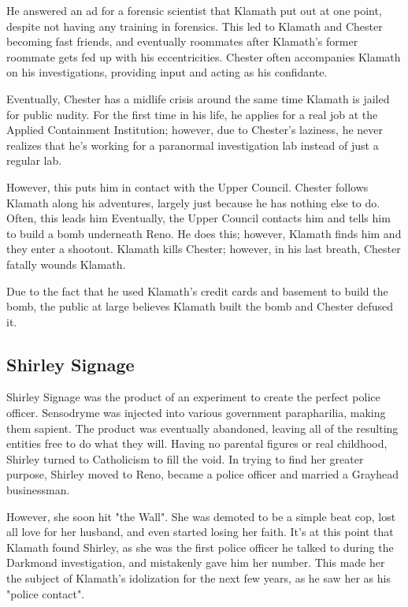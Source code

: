 \documentclass{article}
\begin{document}
He answered an ad for a forensic scientist that Klamath put out at one point, despite not having any training in forensics. This led to Klamath and Chester becoming fast friends, and eventually roommates after Klamath's former roommate gets fed up with his eccentricities. Chester often accompanies Klamath on his investigations, providing input and acting as his confidante.

Eventually, Chester has a midlife crisis around the same time Klamath is jailed for public nudity. For the first time in his life, he applies for a real job at the Applied Containment Institution; however, due to Chester's laziness, he never realizes that he's working for a paranormal investigation lab instead of just a regular lab.

However, this puts him in contact with the Upper Council. Chester follows Klamath along his adventures, largely just because he has nothing else to do. Often, this leads him Eventually, the Upper Council contacts him and tells him to build a bomb underneath Reno. He does this; however, Klamath finds him and they enter a shootout. Klamath kills Chester; however, in his last breath, Chester fatally wounds Klamath.

Due to the fact that he used Klamath's credit cards and basement to build the bomb, the public at large believes Klamath built the bomb and Chester defused it.

\subsection{Shirley Signage}

Shirley Signage was the product of an experiment to create the perfect police officer. Sensodryme was injected into various government parapharilia, making them sapient. The product was eventually abandoned, leaving all of the resulting entities free to do what they will. Having no parental figures or real childhood, Shirley turned to Catholicism to fill the void. In trying to find her greater purpose, Shirley moved to Reno, became a police officer and married a Grayhead businessman.

However, she soon hit "the Wall". She was demoted to be a simple beat cop, lost all love for her husband, and even started losing her faith. It's at this point that Klamath found Shirley, as she was the first police officer he talked to during the Darkmond investigation, and mistakenly gave him her number. This made her the subject of Klamath's idolization for the next few years, as he saw her as his "police contact".
\end{document}
